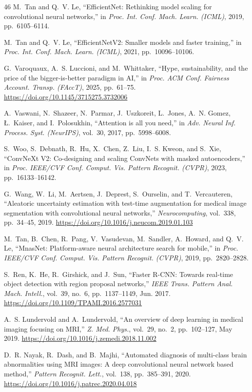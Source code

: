 \documentclass[journal]{IEEEtran}
\providecommand{\doi}[1]{\url{https://doi.org/#1}}
\begin{document}
\begin{thebibliography}{46}
M.~Tan and Q.~V. Le, ``EfficientNet: Rethinking model scaling for convolutional neural networks,'' in \emph{Proc. Int. Conf. Mach. Learn. (ICML)}, 2019, pp.~6105--6114.

M.~Tan and Q.~V. Le, ``EfficientNetV2: Smaller models and faster training,'' in \emph{Proc. Int. Conf. Mach. Learn. (ICML)}, 2021, pp.~10096--10106.

G.~Varoquaux, A.~S. Luccioni, and M.~Whittaker, ``Hype, sustainability, and the price of the bigger-is-better paradigm in AI,'' in \emph{Proc. ACM Conf. Fairness Account. Transp. (FAccT)}, 2025, pp.~61--75. \doi{10.1145/3715275.3732006}

A.~Vaswani, N.~Shazeer, N.~Parmar, J.~Uszkoreit, L.~Jones, A.~N. Gomez, {\L}.~Kaiser, and I.~Polosukhin, ``Attention is all you need,'' in \emph{Adv. Neural Inf. Process. Syst. (NeurIPS)}, vol.~30, 2017, pp.~5998--6008.

S.~Woo, S.~Debnath, R.~Hu, X.~Chen, Z.~Liu, I.~S. Kweon, and S.~Xie, ``ConvNeXt V2: Co-designing and scaling ConvNets with masked autoencoders,'' in \emph{Proc. IEEE/CVF Conf. Comput. Vis. Pattern Recognit. (CVPR)}, 2023, pp.~16133--16142.

G.~Wang, W.~Li, M.~Aertsen, J.~Deprest, S.~Ourselin, and T.~Vercauteren, ``Aleatoric uncertainty estimation with test-time augmentation for medical image segmentation with convolutional neural networks,'' \emph{Neurocomputing}, vol.~338, pp.~34--45, 2019. \doi{10.1016/j.neucom.2019.01.103}

M.~Tan, B.~Chen, R.~Pang, V.~Vasudevan, M.~Sandler, A.~Howard, and Q.~V. Le, ``MnasNet: Platform-aware neural architecture search for mobile,'' in \emph{Proc. IEEE/CVF Conf. Comput. Vis. Pattern Recognit. (CVPR)}, 2019, pp.~2820--2828.

S.~Ren, K.~He, R.~Girshick, and J.~Sun, ``Faster R-CNN: Towards real-time object detection with region proposal networks,'' \emph{IEEE Trans. Pattern Anal. Mach. Intell.}, vol.~39, no.~6, pp.~1137--1149, Jun. 2017. \doi{10.1109/TPAMI.2016.2577031}

A.~S. Lundervold and A.~Lundervold, ``An overview of deep learning in medical imaging focusing on MRI,'' \emph{Z. Med. Phys.}, vol.~29, no.~2, pp.~102--127, May 2019. \doi{10.1016/j.zemedi.2018.11.002}

D.~R. Nayak, R.~Dash, and B.~Majhi, ``Automated diagnosis of multi-class brain abnormalities using MRI images: A deep convolutional neural network based method,'' \emph{Pattern Recognit. Lett.}, vol.~138, pp.~385--391, 2020. \doi{10.1016/j.patrec.2020.04.018}


\end{thebibliography}
\end{document}
